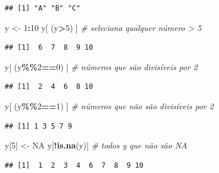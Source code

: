 \documentclass[
]{book}
\newenvironment{Shaded}{\begin{snugshade}}{\end{snugshade}}
\newcommand{\CommentTok}[1]{\textcolor[rgb]{0.56,0.35,0.01}{\textit{#1}}}
\newcommand{\ConstantTok}[1]{\textcolor[rgb]{0.56,0.35,0.01}{#1}}
\newcommand{\DecValTok}[1]{\textcolor[rgb]{0.00,0.00,0.81}{#1}}
\newcommand{\FunctionTok}[1]{\textcolor[rgb]{0.13,0.29,0.53}{\textbf{#1}}}
\newcommand{\NormalTok}[1]{#1}
\newcommand{\OtherTok}[1]{\textcolor[rgb]{0.56,0.35,0.01}{#1}}
\newcommand{\SpecialCharTok}[1]{\textcolor[rgb]{0.81,0.36,0.00}{\textbf{#1}}}
\begin{document}
\begin{verbatim}
## [1] "A" "B" "C"
\end{verbatim}

\begin{Shaded}
\begin{Highlighting}[]
\NormalTok{y }\OtherTok{\textless{}{-}} \DecValTok{1}\SpecialCharTok{:}\DecValTok{10}
\NormalTok{y[ (y}\SpecialCharTok{\textgreater{}}\DecValTok{5}\NormalTok{) ] }\CommentTok{\# seleciona qualquer número \textgreater{} 5}
\end{Highlighting}
\end{Shaded}

\begin{verbatim}
## [1]  6  7  8  9 10
\end{verbatim}

\begin{Shaded}
\begin{Highlighting}[]
\NormalTok{y[ (y}\SpecialCharTok{\%\%}\DecValTok{2}\SpecialCharTok{==}\DecValTok{0}\NormalTok{) ] }\CommentTok{\# números que são divisíveis por 2}
\end{Highlighting}
\end{Shaded}

\begin{verbatim}
## [1]  2  4  6  8 10
\end{verbatim}

\begin{Shaded}
\begin{Highlighting}[]
\NormalTok{y[ (y}\SpecialCharTok{\%\%}\DecValTok{2}\SpecialCharTok{==}\DecValTok{1}\NormalTok{) ] }\CommentTok{\# números que não são divisíveis por 2}
\end{Highlighting}
\end{Shaded}

\begin{verbatim}
## [1] 1 3 5 7 9
\end{verbatim}

\begin{Shaded}
\begin{Highlighting}[]
\NormalTok{y[}\DecValTok{5}\NormalTok{] }\OtherTok{\textless{}{-}} \ConstantTok{NA}
\NormalTok{y[}\SpecialCharTok{!}\FunctionTok{is.na}\NormalTok{(y)] }\CommentTok{\# todos y que não são NA }
\end{Highlighting}
\end{Shaded}

\begin{verbatim}
## [1]  1  2  3  4  6  7  8  9 10
\end{verbatim}
\end{document}
